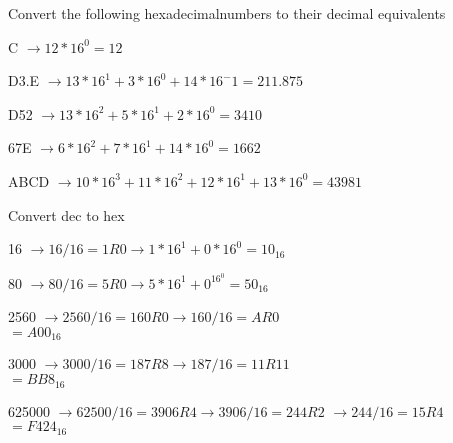 \documentclass[12pt,largemargins]{homework}
\begin{document}
 Convert the following hexadecimalnumbers to their decimal equivalents\\
\begin{alphaparts}
\item
C $\rightarrow 12*16^0 = 12$
\item
D3.E $\rightarrow 13*16^1 + 3*16^0 +14*16^-1 = 211.875$
\item
D52 $\rightarrow 13*16^2 + 5*16^1 + 2*16^0=3410$
\item
67E $\rightarrow 6*16^2 + 7*16^1 + 14*16^0 = 1662$\\
\item
ABCD $\rightarrow 10*16^3 + 11*16^2 + 12*16^1 + 13*16^0 = 43981$
\end{alphaparts}
 Convert dec to hex
\begin{alphaparts}
\item
16 $\rightarrow 16/16 = 1 R 0\rightarrow1*16^1 + 0*16^0 = 10_{16}$
\item
80 $\rightarrow 80/16=5R0 \rightarrow5*16^1 + 0^16^0 = 50_{16}$
\item
2560 $\rightarrow 2560/16=160R0\rightarrow160/16=AR0$\\
$=A00_{16}$
\item
3000 $\rightarrow 3000/16=187R8\rightarrow187/16=11R11$\\
$=BB8_{16}$
\item
625000 $\rightarrow 62500/16=3906R4\rightarrow3906/16=244R2$
$\rightarrow244/16=15R4$\\
$=F424_{16}$
\end{alphaparts}
\end{document}
